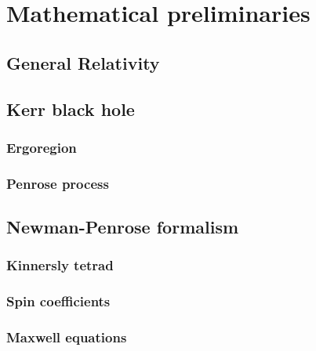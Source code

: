 
\chapter{Mathematical preliminaries} %
\label{Chapter2}


\section{General Relativity}

\section{Kerr black hole}

\subsection{Ergoregion}
\subsection{Penrose process}

\section{Newman-Penrose formalism}

\subsection{Kinnersly tetrad}
\subsection{Spin coefficients}
\subsection{Maxwell equations}


\cleardoublepage